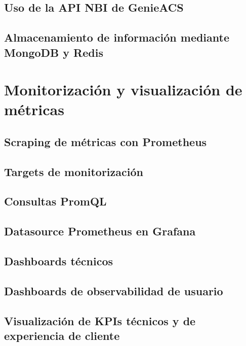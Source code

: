 \subsection{Uso de la API NBI de GenieACS}
\label{subsec:uso-api-nbi-genieacs}

\subsection{Almacenamiento de información mediante MongoDB y Redis}
\label{subsec:almacenamiento-mongodb-redis}


\section{Monitorización y visualización de métricas}
\label{sec:monitorizacion-visualizacion-metricas}

\subsection{Scraping de métricas con Prometheus}
\label{subsec:scraping-metricas-prometheus}

\subsection{Targets de monitorización}
\label{subsec:targets-monitorizacion}

\subsection{Consultas PromQL}
\label{subsec:consultas-promql}

\subsection{Datasource Prometheus en Grafana}
\label{subsec:datasource-prometheus-grafana}

\subsection{Dashboards técnicos}
\label{subsec:dashboards-tecnicos}

\subsection{Dashboards de observabilidad de usuario}
\label{subsec:dashboards-observabilidad-usuario}

\subsection{Visualización de KPIs técnicos y de experiencia de cliente}
\label{subsec:visualizacion-kpis-tecnicos-experiencia-cliente}


